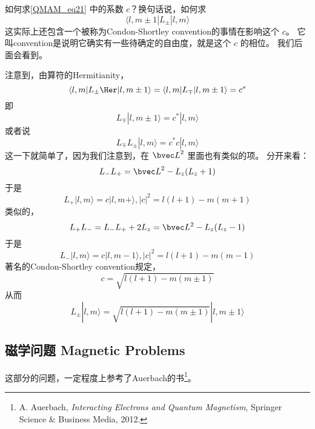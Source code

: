 \begin{exercise}{}\label{QMAM_exe2}
如何求\autoref{QMAM_eq21} 中的系数 $c$？换句话说，如何求
\begin{equation}
\langle l,m\pm1|L_{\pm}|l,m\rangle
\end{equation}
这实际上还包含一个被称为Condon-Shortley convention的事情在影响这个 $c$。 它叫convention是说明它确实有一些待确定的自由度，就是这个 $c$ 的相位。 我们后面会看到。

注意到，由算符的Hermitianity，
\begin{equation}
\langle l,m|L_{\pm}\Her|l,m\pm1\rangle = \langle l,m|L_{\mp}|l,m\pm1\rangle = c^*
\end{equation}
即
\begin{equation}
L_{\mp}|l,m\pm1\rangle = c^*|l,m\rangle
\end{equation}
或者说
\begin{equation}
L_{\mp}L_{\pm}|l,m\rangle = c^*c|l,m\rangle
\end{equation}
这一下就简单了，因为我们注意到，在 ${\bvec L}^2$ 里面也有类似的项。 分开来看：
\begin{equation}
L_-L_+ = {\bvec L}^2 - L_z(L_z+1)
\end{equation}
于是
\begin{equation}
L_+|l,m\rangle = c|l,m+\rangle, |c|^2 = l(l+1)-m(m+1)
\end{equation}
类似的，
\begin{equation}
L_+L_- = L_-L_+ +2L_z = {\bvec L^2} -L_z(L_z-1)
\end{equation}
于是
\begin{equation}
L_-|l,m\rangle = c|l,m-1\rangle, |c|^2 = l(l+1)-m(m-1) 
\end{equation}
著名的Condon-Shortley convention规定，
\begin{equation}
c = \sqrt{l(l+1) - m(m\pm1)}
\end{equation}
从而
\begin{equation}
L_{\pm}|l,m\rangle = \sqrt{l(l+1) - m(m\pm 1)}|l,m\pm1\rangle
\end{equation}
\end{exercise}

\subsection{磁学问题 Magnetic Problems}

这部分的问题，一定程度上参考了Auerbach的书\footnote{A. Auerbach, \textsl{Interacting Electrons and Quantum Magnetism}, Springer Science \& Business Media, 2012.}。